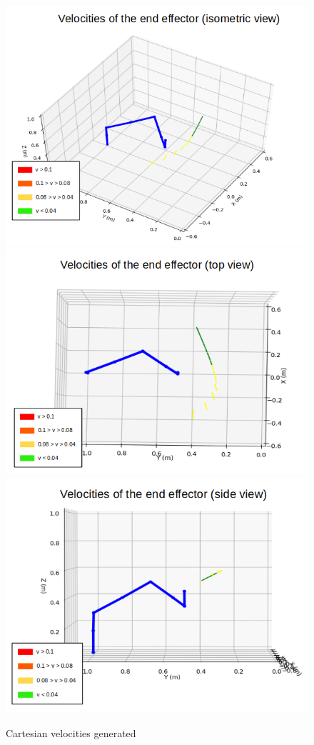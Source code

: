 \documentclass[a4paper, 11.5pt, conference]{ieeeconf}      %
\begin{document}
\begin{figure}[H]
	\centering
	\includegraphics[scale=0.25]{images/two_arms_vector.png}
	\includegraphics[scale=0.25]{images/two_arms_vector_top.png}
	\includegraphics[scale=0.25]{images/two_arms_vector_side.png}
	\caption{Cartesian velocities generated}
	\label{fig:two_arm_avoidance_vector}
\end{figure}
\end{document}
